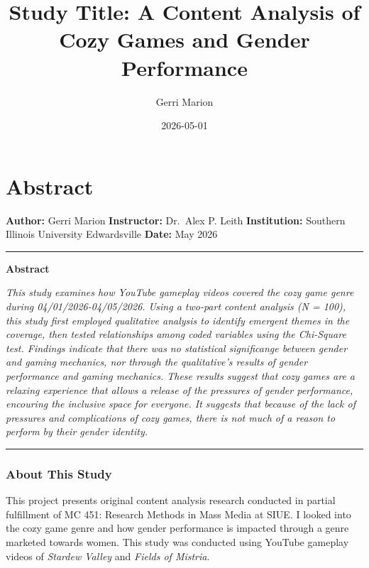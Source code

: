 \documentclass[
  12pt,
  letterpaper,
  DIV=11,
  numbers=noendperiod]{scrreprt}
\title{Study Title: A Content Analysis of Cozy Games and Gender
Performance}
\author{Gerri Marion}
\date{2026-05-01}
\renewcommand*\contentsname{Table of contents}
\newcommand\contentsname{Table of contents}
\begin{document}
\maketitle

\renewcommand*\contentsname{Table of contents}
{
\setcounter{tocdepth}{2}
\tableofcontents
}


\chapter{Abstract}\label{abstract}

\textbf{Author:} Gerri Marion \textbf{Instructor:} Dr.~Alex P. Leith
\textbf{Institution:} Southern Illinois University Edwardsville
\textbf{Date:} May 2026

\begin{center}\rule{0.5\linewidth}{0.5pt}\end{center}

\textbf{Abstract}

\emph{This study examines how YouTube gameplay videos covered the cozy
game genre during 04/01/2026-04/05/2026. Using a two-part content
analysis (N = 100), this study first employed qualitative analysis to
identify emergent themes in the coverage, then tested relationships
among coded variables using the Chi-Square test. Findings indicate that
there was no statistical significange between gender and gaming
mechanics, nor through the qualitative's results of gender performance
and gaming mechanics. These results suggest that cozy games are a
relaxing experience that allows a release of the pressures of gender
performance, encouring the inclusive space for everyone. It suggests
that because of the lack of pressures and complications of cozy games,
there is not much of a reason to perform by their gender identity.}

\begin{center}\rule{0.5\linewidth}{0.5pt}\end{center}

\subsection{About This Study}\label{about-this-study}

This project presents original content analysis research conducted in
partial fulfillment of MC 451: Research Methods in Mass Media at SIUE. I
looked into the cozy game genre and how gender performance is impacted
through a genre marketed towards women. This study was conducted using
YouTube gameplay videos of \emph{Stardew Valley} and \emph{Fields of
Mistria}.
\end{document}
